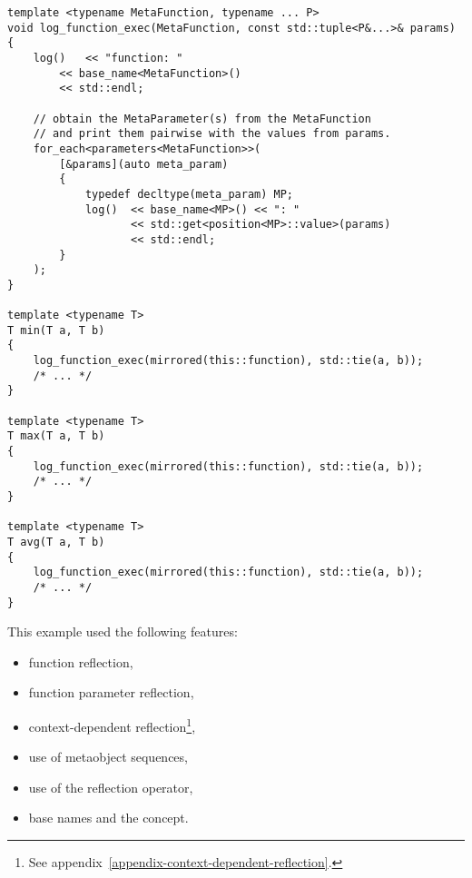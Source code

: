 \begin{verbatim}
template <typename MetaFunction, typename ... P>
void log_function_exec(MetaFunction, const std::tuple<P&...>& params)
{
	log()   << "function: "
		<< base_name<MetaFunction>()
		<< std::endl;

	// obtain the MetaParameter(s) from the MetaFunction
	// and print them pairwise with the values from params.
	for_each<parameters<MetaFunction>>(
		[&params](auto meta_param)
		{
			typedef decltype(meta_param) MP;
			log()  << base_name<MP>() << ": "
			       << std::get<position<MP>::value>(params)
			       << std::endl;
		}
	);
}

template <typename T>
T min(T a, T b)
{
	log_function_exec(mirrored(this::function), std::tie(a, b));
	/* ... */
}

template <typename T>
T max(T a, T b)
{
	log_function_exec(mirrored(this::function), std::tie(a, b));
	/* ... */
}

template <typename T>
T avg(T a, T b)
{
	log_function_exec(mirrored(this::function), std::tie(a, b));
	/* ... */
}
\end{verbatim}

This example used the following features:

\begin{itemize}
\item{function reflection,}
\item{function parameter reflection,}
\item{context-dependent reflection\footnote{See appendix~\ref{appendix-context-dependent-reflection}.}},
\item{use of metaobject sequences,}
\item{use of the reflection operator,}
\item{base names and the  concept.}
\end{itemize}
